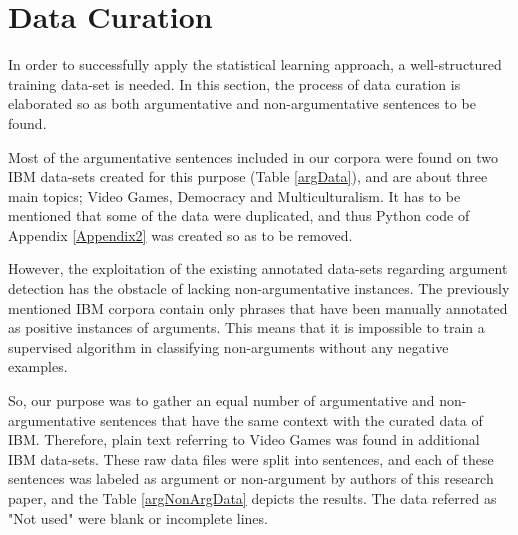 \chapter{Data Curation}

\label{Chapter4} 
In order to successfully apply the statistical learning approach, a well-structured training data-set is needed. In this section, the process of data curation is elaborated so as both argumentative and non-argumentative sentences to be found. \par

Most of the argumentative sentences included in our corpora were found on two IBM data-sets created for this purpose (Table \ref{argData}), and are about three main topics; Video Games, Democracy and Multiculturalism. It has to be mentioned that some of the data were duplicated, and thus Python code of Appendix \ref{Appendix2} was created so as to be removed. \par

\begin{table}[H]
	\centering
	\caption{Argumentative Data Used} 
	\label{argData}
\end{table}

However, the exploitation of the existing annotated data-sets regarding argument detection has the obstacle of lacking non-argumentative instances. The previously mentioned IBM corpora contain only phrases that have been manually annotated as positive instances of arguments. This means that it is impossible to train a supervised algorithm in classifying non-arguments without any negative examples. \par

So, our purpose was to gather an equal number of argumentative and non-argumentative sentences that have the same context with the curated data of IBM. Therefore, plain text referring to Video Games was found in additional IBM data-sets. These raw data files were split into sentences, and each of these sentences was labeled as argument or non-argument by authors of this research paper, and the Table \ref{argNonArgData} depicts the results. The data referred as "Not used" were blank or incomplete lines. \par

